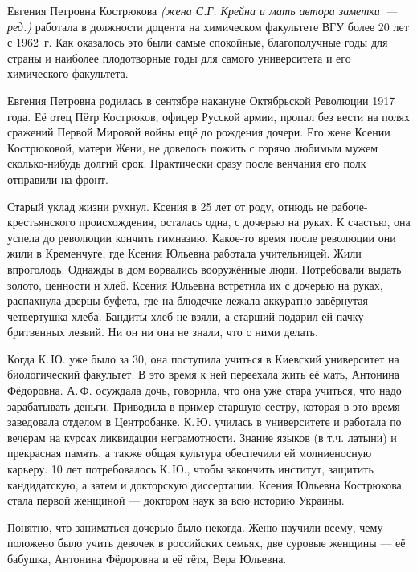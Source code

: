 
\vzmscaption


Евгения Петровна Кострюкова
\textit{(жена С.Г. Крейна и
\linebreak
мать автора заметки~--- ред.)}
работала в должности доцента на химическом факультете ВГУ более 20 лет с 1962~г.
Как оказалось это были самые спокойные, благополучные годы для страны и наиболее плодотворные годы для самого университета и его химического факультета.

Евгения Петровна родилась в сентябре накануне Ок\-тяб\-рь\-с\-кой Революции 1917 года.
Её отец Пётр Кострюков, офицер Русской армии, пропал без вести на полях сражений Первой Мировой войны ещё до рождения дочери. Его жене Ксении Кострюковой, матери Жени, не довелось пожить с горячо любимым мужем сколько-нибудь долгий срок. Практически сразу после венчания его полк отправили на фронт.

Старый уклад жизни рухнул. Ксения в 25 лет от роду, отнюдь не рабоче-крестьянского происхождения, осталась одна,
с дочерью на руках. К счастью, она успела до революции кончить гимназию.
Какое-то время после революции они жили в Кременчуге, где Ксения Юльевна работала учительницей. Жили впроголодь. Однажды в дом ворвались вооружённые люди. Потребовали выдать золото, ценности и хлеб. Ксения Юльевна встретила их с дочерью на руках, распахнула дверцы буфета, где на блюдечке лежала аккуратно завёрнутая четвертушка хлеба. Бандиты хлеб не взяли, а старший подарил ей пачку бритвенных лезвий. Ни он ни она не знали, что с ними делать.

Когда К.\,Ю. уже было за 30, она поступила учиться в Киевский университет на биологический факультет. В это время к ней переехала жить её мать, Антонина Фёдоровна. А.\,Ф. осуждала дочь, говорила, что она уже стара учиться, что надо зарабатывать деньги. Приводила в пример старшую сестру, которая в это время заведовала отделом в Центробанке. К.\,Ю. училась в университете и работала по вечерам на курсах ликвидации неграмотности. Знание языков (в т.ч. латыни) и прекрасная память, а также общая культура обеспечили ей молниеносную карьеру. 10 лет потребовалось К.\,Ю., чтобы закончить институт, защитить кандидатскую, а затем и докторскую диссертации. Ксения Юльевна Кострюкова стала первой женщиной --- доктором наук за всю историю Украины.

Понятно, что заниматься дочерью было некогда.
Женю научили всему, чему положено было учить девочек в российских семьях, две суровые женщины --- её бабушка, Антонина Фёдоровна и её тётя, Вера Юльевна.

